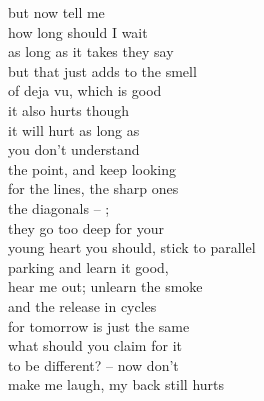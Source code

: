 but now tell me\\
how long should I wait\\
as long as it takes they say\\
but that just adds to the smell\\
of deja vu, which is good\\
it also hurts though\\

it will hurt as long as\\
you don't understand\\
the point, and keep looking\\
for the lines, the sharp ones\\
the diagonals -- ;\\
they go too deep for your\\
young heart you should, stick to parallel\\
parking and learn it good,\\

hear me out; unlearn the smoke\\
and the release in cycles\\
for tomorrow is just the same\\
what should you claim for it\\
to be different? -- now don't\\
make me laugh, my back still hurts
